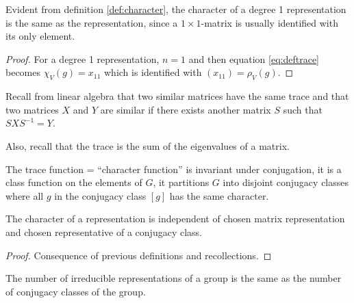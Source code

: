 	\begin{corollary}\label{cor:chardeg1}
		Evident from definition \ref{def:character}, the character of a degree 1 representation is the same as the representation, since a $1 \times 1$-matrix is usually identified with its only element.
	\end{corollary}
	\begin{proof}
		For a degree 1 representation, $n=1$ and then equation \ref{eq:deftrace} becomes $\chi_V(g) = x_{11}$ which is identified with $(x_{11}) = \rho_V(g)$.
	\end{proof}
	
	Recall from linear algebra that two similar matrices have the same trace \cite[Thm 5.4.]{Holst} and that two matrices $X$ and $Y$ are similar if there exists another matrix $S$ such that $SXS^{-1} = Y$. 
	
	Also, recall that the trace is the sum of the eigenvalues of a matrix.
	
	\begin{lemma}
		The trace function = ``character function'' is invariant under conjugation, it is a class function on the elements of $G$, it partitions $G$ into disjoint conjugacy classes where all $g$ in the conjugacy class $[g]$ has the same character.
	\end{lemma}
	
	\begin{theorem}
		The character of a representation is independent of chosen matrix representation and chosen representative of a conjugacy class.
	\end{theorem}
	\begin{proof}
		Consequence of previous definitions and recollections.
	\end{proof}
	
	\begin{theorem}\label{thm:numberirrep}
		The number of irreducible representations of a group is the same as the number of conjugacy classes of the group.
	\end{theorem}
	